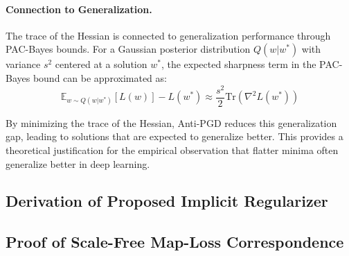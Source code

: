 \paragraph{Connection to Generalization.}
The trace of the Hessian is connected to generalization performance through PAC-Bayes bounds. For a Gaussian posterior distribution $Q(w|w^*)$ with variance $s^2$ centered at a solution $w^*$, the expected sharpness term in the PAC-Bayes bound can be approximated as:
\begin{equation}
\mathbb{E}_{w \sim Q(w|w^*)}[L(w)] - L(w^*) \approx \frac{s^2}{2} \text{Tr}(\nabla^2 L(w^*))
\end{equation}

By minimizing the trace of the Hessian, Anti-PGD reduces this generalization gap, leading to solutions that are expected to generalize better. This provides a theoretical justification for the empirical observation that flatter minima often generalize better in deep learning.
\subsection*{Derivation of Proposed Implicit Regularizer}

\subsection*{Proof of Scale-Free Map-Loss Correspondence}